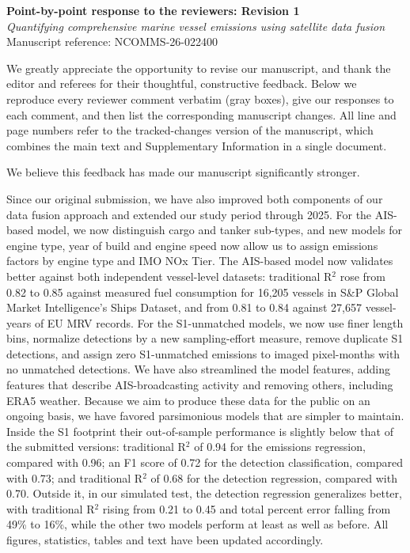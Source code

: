 \documentclass[11pt]{article}
\begin{document}
\begin{center}
  {\Large\bfseries Point-by-point response to the reviewers: Revision 1}\\[4pt]
  {\large \emph{Quantifying comprehensive marine vessel emissions using satellite data fusion}}\\[2pt]
  Manuscript reference: NCOMMS-26-022400
\end{center}

\bigskip
\noindent We greatly appreciate the opportunity to revise our manuscript, and thank the editor and referees for their thoughtful, constructive feedback. Below we reproduce every reviewer comment verbatim (gray boxes), give our responses to each comment, and then list the corresponding manuscript changes. All line and page numbers refer to the tracked-changes version of the manuscript, which combines the main text and Supplementary Information in a single document.

We believe this feedback has made our manuscript significantly stronger.

Since our original submission, we have also improved both components of our data fusion approach and extended our study period through 2025. For the AIS-based model, we now distinguish cargo and tanker sub-types, and new models for engine type, year of build and engine speed now allow us to assign emissions factors by engine type and IMO NOx Tier. The AIS-based model now validates better against both independent vessel-level datasets: traditional R$^{2}$ rose from 0.82 to 0.85 against measured fuel consumption for 16,205 vessels in S\&P Global Market Intelligence's Ships Dataset, and from 0.81 to 0.84 against 27,657 vessel-years of EU MRV records. For the S1-unmatched models, we now use finer length bins, normalize detections by a new sampling-effort measure, remove duplicate S1 detections, and assign zero S1-unmatched emissions to imaged pixel-months with no unmatched detections. We have also streamlined the model features, adding features that describe AIS-broadcasting activity and removing others, including ERA5 weather. Because we aim to produce these data for the public on an ongoing basis, we have favored parsimonious models that are simpler to maintain. Inside the S1 footprint their out-of-sample performance is slightly below that of the submitted versions: traditional R$^{2}$ of 0.94 for the emissions regression, compared with 0.96; an F1 score of 0.72 for the detection classification, compared with 0.73; and traditional R$^{2}$ of 0.68 for the detection regression, compared with 0.70. Outside it, in our simulated test, the detection regression generalizes better, with traditional R$^{2}$ rising from 0.21 to 0.45 and total percent error falling from 49\% to 16\%, while the other two models perform at least as well as before. All figures, statistics, tables and text have been updated accordingly.
\end{document}
